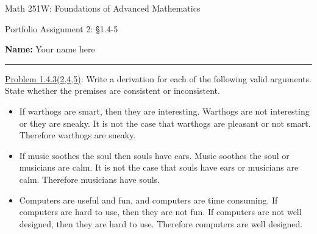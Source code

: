 \documentclass{article}
\theoremstyle{definition}
\begin{document}
	\begin{center}
		\Large{Math 251W: Foundations of Advanced Mathematics}

		\normalsize{Portfolio Assignment 2: \S 1.4-5}

		\vspace{0.2cm}

		\hfill {\bf Name:} Your name here

		\vspace{0.25cm}
		\hrule
	\end{center}

	\vspace{0.3cm}

	\noindent \underline{Problem 1.4.3(2,4,5)}: Write a derivation for each of the following valid arguments. State whether the premises are consistent or inconsistent.

	\begin{itemize}
		\item[(2)] If warthogs are smart, then they are interesting. Warthogs are not interesting or they are sneaky. It is not the case that warthogs are pleasant or not smart. Therefore warthogs are sneaky.
		\item[(4)] If music soothes the soul then souls have ears. Music soothes the soul or musicians are calm. It is not the case that souls have ears or musicians are calm. Therefore musicians have souls.
		\item[(5)] Computers are useful and fun, and computers are time consuming. If computers are hard to use, then they are not fun. If computers are not well designed, then they are hard to use. Therefore computers are well designed.
	\end{itemize}
	\vspace{0.25cm}
\end{document}
